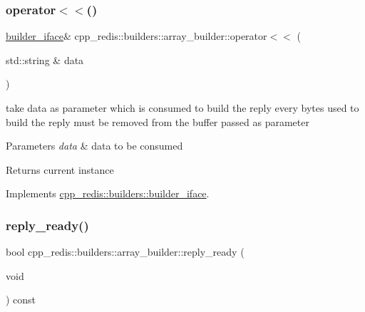 \mbox{\label{classcpp__redis_1_1builders_1_1array__builder_a043357d0ef70406adef4df78c8d5307f}} 
\subsubsection{\texorpdfstring{operator$<$$<$()}{operator<<()}}
{\footnotesize\ttfamily \mbox{\hyperlink{classcpp__redis_1_1builders_1_1builder__iface}{builder\+\_\+iface}}\& cpp\+\_\+redis\+::builders\+::array\+\_\+builder\+::operator$<$$<$ (\begin{DoxyParamCaption}\item[{std\+::string \&}]{data }\end{DoxyParamCaption})\hspace{0.3cm}{\ttfamily [virtual]}}

take data as parameter which is consumed to build the reply every bytes used to build the reply must be removed from the buffer passed as parameter


\begin{DoxyParams}{Parameters}
{\em data} & data to be consumed \\
\hline
\end{DoxyParams}
\begin{DoxyReturn}{Returns}
current instance 
\end{DoxyReturn}


Implements \mbox{\hyperlink{classcpp__redis_1_1builders_1_1builder__iface_a9892bbc9c887c31c2742dad4476e2fa6}{cpp\+\_\+redis\+::builders\+::builder\+\_\+iface}}.

\mbox{\label{classcpp__redis_1_1builders_1_1array__builder_a524f2cb943dde1246dea1b7057e6351e}} 
\subsubsection{\texorpdfstring{reply\+\_\+ready()}{reply\_ready()}}
{\footnotesize\ttfamily bool cpp\+\_\+redis\+::builders\+::array\+\_\+builder\+::reply\+\_\+ready (\begin{DoxyParamCaption}\item[{void}]{ }\end{DoxyParamCaption}) const\hspace{0.3cm}{\ttfamily [virtual]}}


